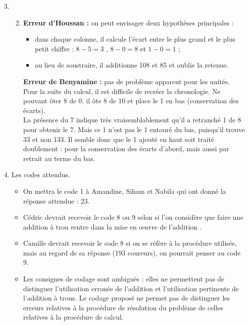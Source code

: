 \Coupe
\begin{enumerate}
\setcounter{enumi}{2}
   \item
   \begin{enumerate}
   \setcounter{enumii}{1}
   \item {\bf Erreur d'Houssan :} on peut envisager deux hypothèses principales :
  \begin{itemize}
   \item dans chaque colonne, il calcule l'écart entre le plus grand et le plus petit chiffre : $8 - 5 = 3$ , $8 - 0 =8$ et $1 - 0 =1$ ;
   \item au lieu de soustraire, il additionne 108 et 85 et oublie la retenue.
   \end{itemize}
   {\bf Erreur de Benyamine :} pas de problème apparent pour les unités. Pour la suite du calcul, il est difficile de recréer la chronologie. Ne pouvant ôter 8 de 0, il ôte 8 de 10 et place le 1 en bas (conservation des écarts). \\
   La présence du 7 indique très vraisemblablement qu'il a retranché 1 de 8 pour obtenir le 7. Mais ce 1 n'est pas le 1 entouré du bas, puisqu'il trouve 33 et non 133. Il semble donc que le 1 ajouté en haut soit traité doublement : pour la conservation des écarts d'abord, mais aussi par retrait au terme du bas.
   \end{enumerate}
   \item Les codes attendus.
   \begin{itemize}
      \item On mettra le code 1 à Amandine, Siham et Nabila qui ont donné la réponse attendue : 23.
      \item Cédric devrait recevoir le code 8 ou 9 selon si l'on considère que faire une addition à trou rentre dans la \og mise en \oe uvre de l'addition \fg.
      \item Camille devrait recevoir le code 8 si on se réfère à la procédure utilisée, mais au regard de sa réponse (193 coureurs), on pourrait penser au code 9.
      \item Les consignes de codage sont ambiguës : elles ne permettent pas de distinguer l'utilisation erronée de l'addition et l'utilisation pertinente de l'addition à trous. Le codage proposé ne permet pas de distinguer les erreurs relatives à la procédure de résolution du problème de celles relatives à la procédure de calcul. \\
   \end{itemize}
\end{enumerate}
